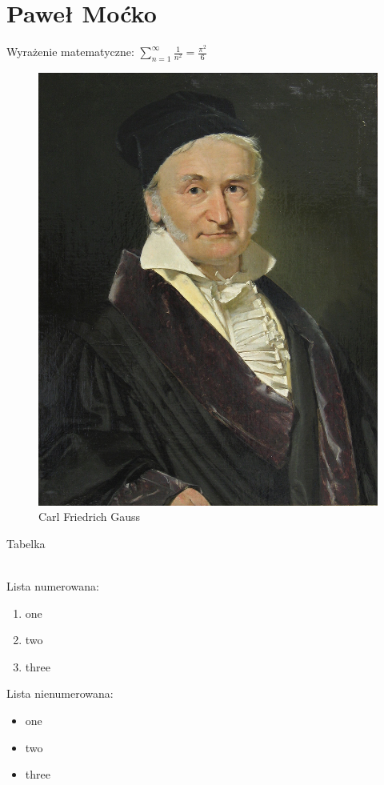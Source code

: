 \section{Paweł Moćko}
Wyrażenie matematyczne: 
$
    \sum^{\infty}_{n=1}\frac{1}{n^2} = \frac{\pi^2}{6}
$


\begin{figure} [htbp]
    \centering
    \includegraphics[scale=.25]{pictures/gauss.png}
    \caption{Carl Friedrich Gauss}
\end{figure}

Tabelka

\\

Lista numerowana:
\begin{enumerate}
    \item one
    \item two
    \item three
\end{enumerate}

 Lista nienumerowana:
\begin{itemize}
    \item one
    \item two
    \item three
\end{itemize}

